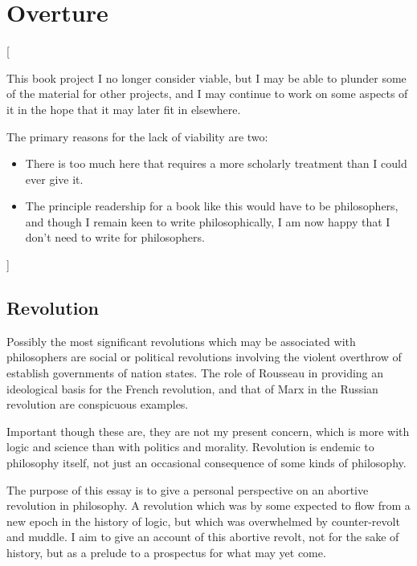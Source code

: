\chapter{Overture}\label{Overture}

[{\it

This book project I no longer consider viable, but I may be able to plunder some of the material for other projects, and I may continue to work on some aspects of it in the hope that it may later fit in elsewhere.

The primary reasons for the lack of viability are two:
\begin{itemize}
\item There is too much here that requires a more scholarly treatment than I could ever give it.

\item The principle readership for a book like this would have to be philosophers, and though I remain keen to write philosophically, I am now happy that I don't need to write for philosophers.

\end{itemize}

}]

\section{Revolution}

Possibly the most significant revolutions which may be associated with philosophers are social or political revolutions involving the violent overthrow of establish governments of nation states.
The role of Rousseau in providing an ideological basis for the French revolution, and that of Marx in the Russian revolution are conspicuous examples.

Important though these are, they are not my present concern, which is more with logic and science than with politics and morality.
Revolution is endemic to philosophy itself, not just an occasional consequence of some kinds of philosophy.

The purpose of this essay is to give a personal perspective on an abortive revolution in philosophy.
A revolution which was by some expected to flow from a new epoch in the history of logic, but which was overwhelmed by counter-revolt and muddle.
I aim to give an account of this abortive revolt, not for the sake of history, but as a prelude to a prospectus for what may yet come.

